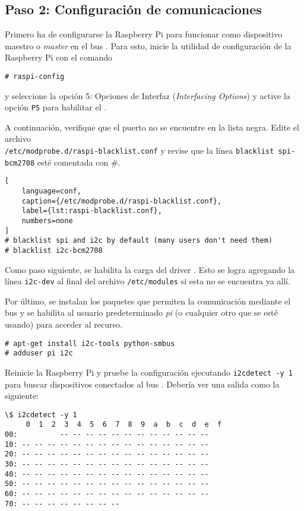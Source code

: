 %
%

\subsection{Paso 2: Configuración de comunicaciones \IIC}%
\label{sec:step3}
Primero ha de configurarse la Raspberry Pi para funcionar como dispositivo maestro o \emph{master} en el bus \IIC.
Para esto, inicie la utilidad de configuración de la Raspberry Pi con el comando

\begin{Verbatim}
# raspi-config
\end{Verbatim}

\noindent y seleccione la opción 5: Opciones de Interfaz (\emph{Interfacing Options}) y active la opción \texttt{P5} para habilitar el \IIC.

A continuación, verifique que el puerto \IIC no se encuentre en la lista negra.
Edite el archivo \\\texttt{/etc/modprobe.d/raspi-blacklist.conf} y revise que la línea \texttt{blacklist spi-bcm2708} esté comentada con \#.

\begin{lstlisting}[
	language=conf,
	caption={/etc/modprobe.d/raspi-blacklist.conf},
	label={lst:raspi-blacklist.conf},
	numbers=none
]
# blacklist spi and i2c by default (many users don't need them)
# blacklist i2c-bcm2708
\end{lstlisting}

Como paso siguiente, se habilita la carga del driver \IIC.
Esto se logra agregando la línea \texttt{i2c-dev} al final del archivo \texttt{/etc/modules} si esta no se encuentra ya allí.

Por último, se instalan los paquetes que permiten la comunicación mediante el bus \IIC y se habilita al usuario predeterminado \emph{pi} (o cualquier otro que se esté usando) para acceder al recurso.

\begin{Verbatim}
# apt-get install i2c-tools python-smbus
# adduser pi i2c
\end{Verbatim}

Reinicie la Raspberry Pi y pruebe la configuración ejecutando \texttt{i2cdetect -y 1} para buscar dispositivos conectados al bus \IIC.
Debería ver una salida como la siguiente:

\begin{Verbatim}
\$ i2cdetect -y 1
     0  1  2  3  4  5  6  7  8  9  a  b  c  d  e  f
00:          -- -- -- -- -- -- -- -- -- -- -- --
10: -- -- -- -- -- -- -- -- -- -- -- -- -- -- --
20: -- -- -- -- -- -- -- -- -- -- -- -- -- -- --
30: -- -- -- -- -- -- -- -- -- -- -- -- -- -- --
40: -- -- -- -- -- -- -- -- -- -- -- -- -- -- --
50: -- -- -- -- -- -- -- -- -- -- -- -- -- -- --
60: -- -- -- -- -- -- -- -- -- -- -- -- -- -- --
70: -- -- -- -- -- -- -- --
\end{Verbatim}
